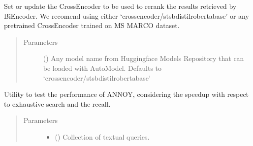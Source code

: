 \documentclass[letterpaper,10pt,english]{sphinxmanual}
\begin{document}
\begin{fulllineitems}
\begin{fulllineitems}
\label{\detokenize{code:semantic_search.SemanticSearch.setup_crossencoder}}
Set or update the Cross\sphinxhyphen{}Encoder to be used to re\sphinxhyphen{}rank the results 
retrieved by Bi\sphinxhyphen{}Encoder. We recomend using either 
‘cross\sphinxhyphen{}encoder/stsb\sphinxhyphen{}distilroberta\sphinxhyphen{}base’ or any pretrained Cross\sphinxhyphen{}Encoder
trained on  MS MARCO dataset.
\begin{quote}\begin{description}
\item[{Parameters}] \leavevmode
{} (\sphinxstyleliteralemphasis{\sphinxupquote{, }}) \textendash{} Any model name from Huggingface Models 
Repository that can be loaded with AutoModel. Defaults to 
‘cross\sphinxhyphen{}encoder/stsb\sphinxhyphen{}distilroberta\sphinxhyphen{}base’

\end{description}\end{quote}

\end{fulllineitems}


\begin{fulllineitems}
\label{\detokenize{code:semantic_search.SemanticSearch.test_annoy_performance}}
Utility to test the performance of ANNOY, considering the speedup with respect to
exhaustive search and the recall.
\begin{quote}\begin{description}
\item[{Parameters}] \leavevmode\begin{itemize}
\item {} 
 () \textendash{} Collection of textual queries.


\end{itemize}
\end{description}
\end{quote}
\end{fulllineitems}
\end{fulllineitems}
\end{document}
